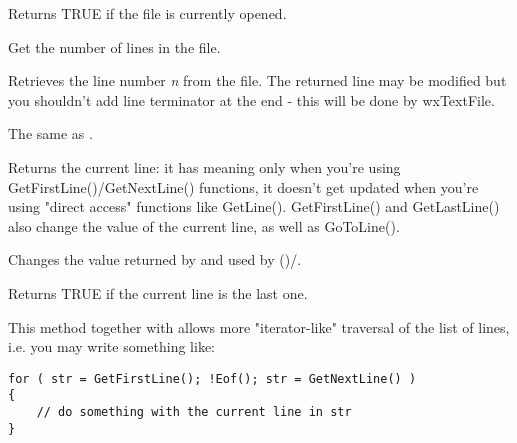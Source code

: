 \label{wxtextfileisopened}

Returns TRUE if the file is currently opened.

\label{wxtextfilegetlinecount}

Get the number of lines in the file.

\label{wxtextfilegetline}

Retrieves the line number {\it n} from the file. The returned line may be
modified but you shouldn't add line terminator at the end - this will be done
by wxTextFile.

\label{wxtextfileoperator[]}

The same as .

\label{wxtextfilegetcurrentline}

Returns the current line: it has meaning only when you're using
GetFirstLine()/GetNextLine() functions, it doesn't get updated when
you're using "direct access" functions like GetLine(). GetFirstLine() and
GetLastLine() also change the value of the current line, as well as
GoToLine().

\label{wxtextfilegotoline}

Changes the value returned by  
and used by ()/.

\label{wxtextfileeof}

Returns TRUE if the current line is the last one.

\label{wxtextfilegetfirstline}

This method together with  
allows more "iterator-like" traversal of the list of lines, i.e. you may
write something like:

\begin{verbatim}
for ( str = GetFirstLine(); !Eof(); str = GetNextLine() )
{
    // do something with the current line in str
}
\end{verbatim}

